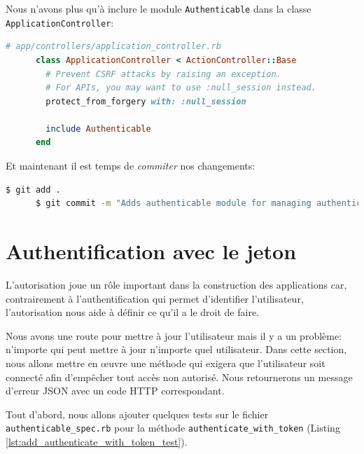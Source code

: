 \documentclass[]{report}
\begin{document}
    Nous n'avons plus qu'à inclure le module \verb|Authenticable| dans la classe \verb|ApplicationController|:


    \begin{scriptsize}
      \begin{lstlisting}[language=ruby]
      # app/controllers/application_controller.rb
      class ApplicationController < ActionController::Base
        # Prevent CSRF attacks by raising an exception.
        # For APIs, you may want to use :null_session instead.
        protect_from_forgery with: :null_session

        include Authenticable
      end
      \end{lstlisting}
    \end{scriptsize}

    Et maintenant il est temps de \textit{commiter} nos changements:

    \begin{scriptsize}
      \begin{lstlisting}[language=bash]
      $ git add .
      $ git commit -m "Adds authenticable module for managing authentication methods"
      \end{lstlisting}
    \end{scriptsize}

  \section{Authentification avec le jeton}

    L'autorisation joue un rôle important dans la construction des applications car, contrairement à l'authentification qui permet d'identifier l'utilisateur, l'autorisation nous aide à définir ce qu'il a le droit de faire.

    Nous avons une route pour mettre à jour l'utilisateur mais il y a un problème: n'importe qui peut mettre à jour n'importe quel utilisateur. Dans cette section, nous allons mettre en œuvre une méthode qui exigera que l'utilisateur soit connecté afin d'empêcher tout accès non autorisé. Nous retournerons un message d'erreur JSON avec un code HTTP correspondant.

    Tout d'abord, nous allons ajouter quelques tests sur le fichier \verb|authenticable_spec.rb| pour la méthode \verb|authenticate_with_token| (Listing \ref{lst:add_authenticate_with_token_test}).
\end{document}
